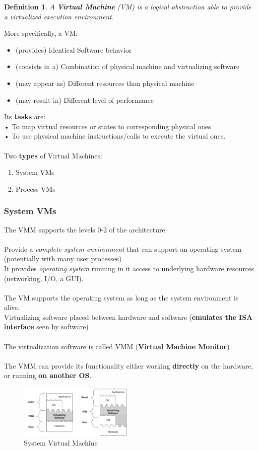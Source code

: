 \documentclass[10pt, oneside]{article}
\newtheorem{defn}{Definition}
\begin{document}
\begin{defn}
    A {\bf Virtual Machine} (VM) is a logical abstraction able to provide a virtualized
execution environment. 
\end{defn}
More specifically, a VM:
\begin{itemize}
    \item (provides) Identical Software behavior
    \item (consists in a) Combination of physical machine and virtualizing software
    \item (may appear as) Different resources than physical machine
    \item (may result in) Different level of performance
\end{itemize}
Its {\bf tasks} are:\\
• To map virtual resources or states to corresponding physical ones\\
• To use physical machine instructions/calls to execute the virtual ones.\\ \\
Two {\bf types} of Virtual Machines:
\begin{enumerate}
    \item System VMs
    \item Process VMs
\end{enumerate}
\subsubsection{System VMs}
The VMM supports the levels 0-2 of the architecture.\\ \\
Provide a {\sl complete system environment} that can support an operating system (potentially with many user processes)\\
It provides {\sl operating system} running in it access to underlying hardware resources (networking, I/O, a GUI).\\ \\
The VM supports the operating system as long as the system environment is alive.\\
Virtualizing software placed between hardware and software ({\bf emulates the ISA interface} seen by software)\\ \\
The virtualization software is called VMM ({\bf Virtual Machine Monitor})\\\\
The VMM can provide its functionality either working {\bf directly} on the hardware, or running {\bf on another OS}.
\begin{figure}[H]
    \begin{center}
    \includegraphics[width=0.5\textwidth]{img/img32.png}
    \caption{System Virtual Machine}
    \label{fig:System VMs}
    \end{center}
\end{figure}
\end{document}
